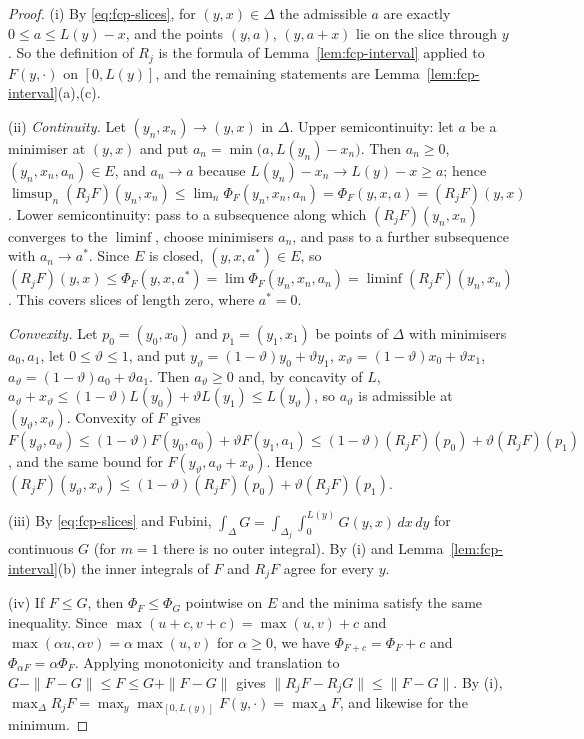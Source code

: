 \begin{proof}
(i) By \eqref{eq:fcp-slices}, for $(y,x)\in\Delta$ the admissible $a$ are exactly $0\le a\le L(y)-x$, and the points
$(y,a)$, $(y,a+x)$ lie on the slice through $y$. So the definition of $R_j$ is the formula of
Lemma~\ref{lem:fcp-interval} applied to $F(y,\cdot)$ on $[0,L(y)]$, and the remaining statements are
Lemma~\ref{lem:fcp-interval}(a),(c).

(ii) \emph{Continuity.} Let $(y_n,x_n)\to(y,x)$ in $\Delta$. Upper semicontinuity: let $a$ be a minimiser at $(y,x)$
and put $a_n=\min\bigl(a,L(y_n)-x_n\bigr)$. Then $a_n\ge0$, $(y_n,x_n,a_n)\in E$, and $a_n\to a$ because
$L(y_n)-x_n\to L(y)-x\ge a$; hence
$\limsup_n(R_jF)(y_n,x_n)\le\lim_n\Phi_F(y_n,x_n,a_n)=\Phi_F(y,x,a)=(R_jF)(y,x)$. Lower semicontinuity: pass to a
subsequence along which $(R_jF)(y_n,x_n)$ converges to the $\liminf$, choose minimisers $a_n$, and pass to a further
subsequence with $a_n\to a^*$. Since $E$ is closed, $(y,x,a^*)\in E$, so
$(R_jF)(y,x)\le\Phi_F(y,x,a^*)=\lim\Phi_F(y_n,x_n,a_n)=\liminf(R_jF)(y_n,x_n)$. This covers slices of length zero,
where $a^*=0$.

\emph{Convexity.} Let $p_0=(y_0,x_0)$ and $p_1=(y_1,x_1)$ be points of $\Delta$ with minimisers $a_0,a_1$, let
$0\le\vartheta\le1$, and put $y_\vartheta=(1-\vartheta)y_0+\vartheta y_1$, $x_\vartheta=(1-\vartheta)x_0+\vartheta x_1$,
$a_\vartheta=(1-\vartheta)a_0+\vartheta a_1$. Then $a_\vartheta\ge0$ and, by concavity of $L$,
$a_\vartheta+x_\vartheta\le(1-\vartheta)L(y_0)+\vartheta L(y_1)\le L(y_\vartheta)$, so $a_\vartheta$ is admissible at
$(y_\vartheta,x_\vartheta)$. Convexity of $F$ gives
$F(y_\vartheta,a_\vartheta)\le(1-\vartheta)F(y_0,a_0)+\vartheta F(y_1,a_1)\le(1-\vartheta)(R_jF)(p_0)+\vartheta(R_jF)(p_1)$,
and the same bound for $F(y_\vartheta,a_\vartheta+x_\vartheta)$. Hence
$(R_jF)(y_\vartheta,x_\vartheta)\le(1-\vartheta)(R_jF)(p_0)+\vartheta(R_jF)(p_1)$.

(iii) By \eqref{eq:fcp-slices} and Fubini, $\int_\Delta G=\int_{\Delta_j}\int_0^{L(y)}G(y,x)\,dx\,dy$ for continuous
$G$ (for $m=1$ there is no outer integral). By (i) and Lemma~\ref{lem:fcp-interval}(b) the inner integrals of $F$ and
$R_jF$ agree for every $y$.

(iv) If $F\le G$, then $\Phi_F\le\Phi_G$ pointwise on $E$ and the minima satisfy the same inequality. Since
$\max(u+c,v+c)=\max(u,v)+c$ and $\max(\alpha u,\alpha v)=\alpha\max(u,v)$ for $\alpha\ge0$, we have
$\Phi_{F+c}=\Phi_F+c$ and $\Phi_{\alpha F}=\alpha\Phi_F$. Applying monotonicity and translation to
$G-\|F-G\|\le F\le G+\|F-G\|$ gives $\|R_jF-R_jG\|\le\|F-G\|$. By (i),
$\max_\Delta R_jF=\max_{y}\max_{[0,L(y)]}F(y,\cdot)=\max_\Delta F$, and likewise for the minimum.


\end{proof}
